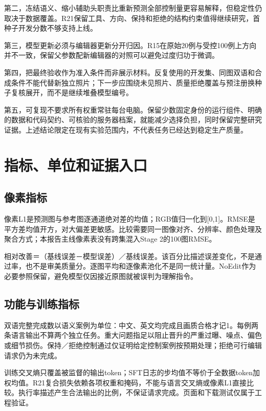 \documentclass[UTF8,fontset=none,zihao=5,a4paper]{ctexart}
\begin{document}
第二，冻结语义、缩小辅助头职责比重新预测全部控制量更容易解释，但稳定性仍取决于数据覆盖。R21保留工具、方向、保持和拒绝的结构约束值得继续研究，首种子开发分数不够支持上线。

第三，模型更新必须与编辑器更新分开归因。R15在原始20例与受控100例上方向并不一致，保留父参数配新编辑器的对照可以避免过度归功于微调。

第四，把最终验收作为准入条件而非展示材料。反复使用的开发集、同图双语和合成条件不能代替新独立照片；下一步应围绕未见照片、质量拒绝覆盖与预注册换种子复核展开，而不是继续堆叠模型编号。

第五，可复现不要求所有权重常驻每台电脑。保留少数固定身份的运行组件、明确的数据和代码契约、可核验的服务器档案，就能减少选择负担，同时保留完整研究证据。上述结论限定在现有实验范围内，不代表任务已经达到稳定生产质量。

\appendix
\section{指标、单位和证据入口}
\subsection{像素指标}
像素L1是预测图与参考图逐通道绝对差的均值；RGB值归一化到[0,1]。RMSE是平方差均值开方，对大偏差更敏感。比较需要同一图像对齐、分辨率、颜色处理及聚合方式；本报告主线像素表没有跨集混入Stage 2的100图RMSE。

相对改善＝（基线误差－模型误差）／基线误差。该百分比描述误差变化，不是通过率，也不是审美质量分。逐图平均和逐像素池化不是同一统计量。NoEdit作为必要参照保留，避免模型仅因接近原图就被误判为理解指令。

\subsection{功能与训练指标}
双语完整完成数以语义案例为单位：中文、英文均完成且画质合格才记1。每例两条语言输出不算两个独立任务。重大问题指足以阻止晋升的严重过曝、噪点、偏色或细节损伤。保持／拒绝控制通过仅证明给定控制案例按预期处理；拒绝可行编辑请求仍为未完成。

训练交叉熵只覆盖被监督的输出token；SFT日志的步均值不等价于全数据token加权均值。R21复合损失依赖各项权重和掩码，不能与语言交叉熵或像素L1直接比较。执行率描述产生合法输出的比例，不保证请求完成。页面和下载测试仅属于工程验证。
\end{document}
